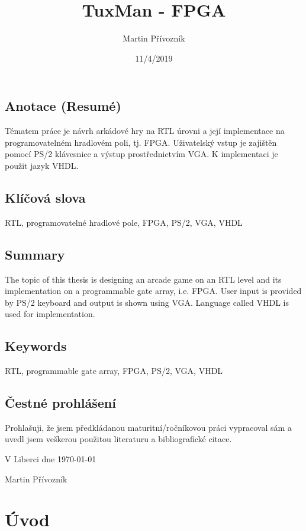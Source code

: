 \documentclass{report}
\title{TuxMan - FPGA}
\date{11/4/2019}
\author{Martin Přívozník}
\newcommand*\wildcard[2][5cm]{\vspace*{2cm}\parbox{#1}{\hrulefill\par#2}}
\begin{document}
  
  \newpage

 \section*{Anotace (Resumé)}
 Tématem práce je návrh arkádové hry na RTL úrovni a její implementace na programovatelném hradlovém poli, tj. FPGA. Uživatelský vstup je zajištěn pomocí PS/2 klávesnice a výstup prostřednictvím VGA. K implementaci je použit jazyk VHDL.

\section*{Klíčová slova}
RTL, programovatelné hradlové pole, FPGA, PS/2, VGA, VHDL

 \section*{Summary}
 The topic of this thesis is designing an arcade game on an RTL level and its implementation on a programmable gate array, i.e. FPGA. User input is provided by PS/2 keyboard and output is shown using VGA. Language called VHDL is used for implementation.

\section*{Keywords}
RTL, programmable gate array, FPGA, PS/2, VGA, VHDL

 \newpage
\vspace*{\fill}

 \section*{Čestné prohlášení}
 Prohlašuji, že jsem předkládanou maturitní/ročníkovou práci vypracoval sám a uvedl jsem veškerou použitou literaturu a bibliografické citace.

\vspace{ 2cm}
  V Liberci dne \today
  \hspace{2cm}
  \wildcard{Martin Přívozník}

\newpage
\tableofcontents

\newpage
{}

\chapter*{Úvod}
\end{document}
